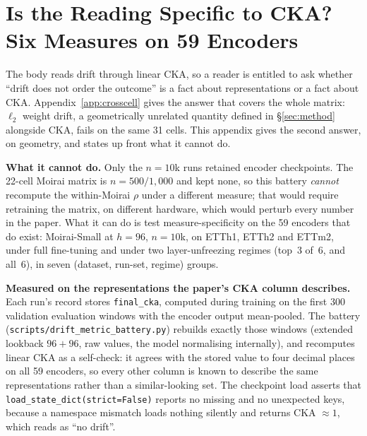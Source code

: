 \section{Is the Reading Specific to CKA? Six Measures on 59 Encoders}
\label{app:driftmetrics}

The body reads drift through linear CKA, so a reader is entitled to ask whether
``drift does not order the outcome'' is a fact about representations or a fact
about CKA. Appendix~\ref{app:crosscell} gives the answer that covers the whole
matrix: $\ell_2$ weight drift, a geometrically unrelated quantity defined in
\S\ref{sec:method} alongside CKA, fails on the same 31 cells. This appendix
gives the second answer, on geometry, and states up front what it cannot do.

\textbf{What it cannot do.} Only the $n{=}10$k runs retained encoder
checkpoints. The 22-cell Moirai matrix is $n{=}500/1{,}000$ and kept none, so
this battery \emph{cannot} recompute the within-Moirai $\rho$ under a different
measure; that would require retraining the matrix, on different hardware, which
would perturb every number in the paper. What it can do is test
measure-specificity on the 59 encoders that do exist: Moirai-Small at $h{=}96$,
$n{=}10$k, on ETTh1, ETTh2 and ETTm2, under full fine-tuning and under two
layer-unfreezing regimes (top~3 of~6, and all~6), in seven
(dataset, run-set, regime) groups.

\textbf{Measured on the representations the paper's CKA column describes.} Each
run's record stores \texttt{final\_cka}, computed during training on the first
300 validation evaluation windows with the encoder output mean-pooled. The
battery (\texttt{scripts/drift\_metric\_battery.py}) rebuilds exactly those
windows (extended lookback $96{+}96$, raw values, the model normalising
internally), and recomputes linear CKA as a self-check: it agrees with the
stored value to four decimal places on all 59 encoders, so every other column is
known to describe the same representations rather than a similar-looking set.
The checkpoint load asserts that \texttt{load\_state\_dict(strict=False)}
reports no missing and no unexpected keys, because a namespace mismatch loads
nothing silently and returns CKA ${\approx}1$, which reads as ``no drift''.

